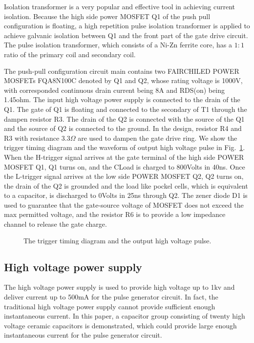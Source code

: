 \documentclass[aip,rsi,reprint,graphicx]{revtex4-1} %
\begin{document}
Isolation transformer is a very popular and effective tool in achieving current isolation. 
Because the high side power MOSFET Q1 of the push pull configuration is floating, a high repetition pulse isolation transformer is applied to achieve galvanic isolation between Q1 and the front part of the gate drive circuit. 
The pulse isolation transformer, which consists of a Ni-Zn ferrite core, has a $1:1$ ratio of the primary coil and secondary coil.

The push-pull configuration circuit main contains two FAIRCHILED POWER MOSFETs FQA8N100C denoted by Q1 and Q2, whose rating voltage is 1000V, with corresponded continuous drain current being 8A and RDS(on) being 1.45ohm.
The input high voltage power supply is connected to the drain of the Q1. The gate of Q1 is floating and connected to the secondary of T1 through the dampen resistor R3. 
The drain of the Q2 is connected with the source of the Q1 and the source of Q2 is connected to the ground. 
In the design, resistor R4 and R3 with resistance $3.3\Omega$ are used to dampen the gate drive ring.
We show the trigger timing diagram and the waveform of output high voltage pulse in Fig.~\ref{FIG2}. 
When the H-trigger signal arrives at the gate terminal of the high side POWER MOSFET Q1, Q1 turns on, and the CLoad is charged to 800Volts in 40ns. 
Once the L-trigger signal arrives at the low side POWER MOSFET Q2, Q2 turns on, the drain of the Q2 is grounded and the load like pockel cells, which is equivalent to a capacitor, is discharged to 0Volts in 25ns through Q2. 
The zener diode D1 is used to guarantee that the gate-source voltage of MOSFET does not exceed the max permitted voltage, and the resistor R6 is to provide a low impedance channel to release the gate charge.
\begin{figure}
\caption{The trigger timing diagram and the output high voltage pulse. \label{FIG2}}%
\end{figure}

\subsection{High voltage power supply}


	The high voltage power supply is used to provide high voltage up to 1kv and deliver current up to 500mA for the pulse generator circuit. 
In fact, the traditional high voltage power supply cannot provide sufficient enough instantaneous current. 
In this paper, a capacitor group consisting of twenty high voltage ceramic capacitors is demonstrated, which could provide large enough instantaneous current for the pulse generator circuit.
\end{document}
